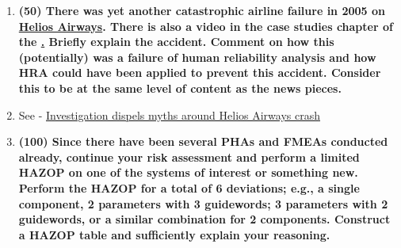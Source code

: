 \documentclass[11pt,a4paper]{article}
\begin{document}
\begin{enumerate}[leftmargin=*,topsep=0pt,font=\bfseries]
    \item\textbf{(50) There was yet another catastrophic airline failure in 2005 on \href{https://en.wikipedia.org/wiki/Helios_Airways_Flight_522}{Helios Airways}. There is also a video in the case studies chapter of the \href{https://courses.lumenlearning.com/uidaho-riskassessment/chapter/contemporary-cases-in-risk-assessment-2/}. Briefly explain the accident. Comment on how this (potentially) was a failure of human reliability analysis and how HRA could have been applied to prevent this accident. Consider this to be at the same level of content as the news pieces.}
    \item[] See - \href{https://www.flightglobal.com/news/articles/investigation-dispels-myths-around-helios-airways-cr-209984/}{Investigation dispels myths around Helios Airways crash}
        \vspace{\baselineskip}

        
        
        
        
        
        
        
        
        
        
        
        
        
        
        
        
        
        
        
        
        
        
        
        
        \newpage
    \item\textbf{(100) Since there have been several PHAs and FMEAs conducted already, continue your risk assessment and perform a limited HAZOP on one of the systems of interest or something new. Perform the HAZOP for a total of 6 deviations; e.g., a single component, 2 parameters with 3 guidewords; 3 parameters with 2 guidewords, or a similar combination for 2 components. Construct a HAZOP table and sufficiently explain your reasoning.}
        \vspace{\baselineskip}

        
        
        
        
        
        
        
        
        
        

\end{enumerate}
\end{document}
